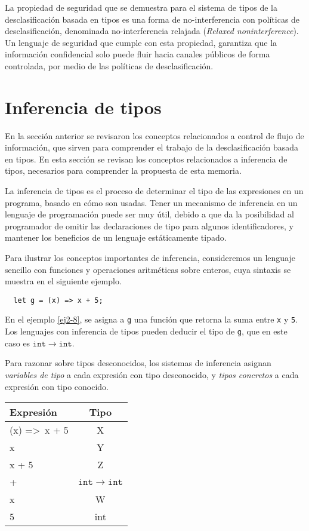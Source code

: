 La propiedad de seguridad que se demuestra para el sistema de tipos de la desclasificación basada en tipos es una forma de no-interferencia con políticas de desclasificación, denominada no-interferencia relajada (\emph{Relaxed noninterference}). Un lenguaje de seguridad que cumple con esta propiedad, garantiza que la información confidencial solo puede fluir hacia canales públicos de forma controlada, por medio de las políticas de desclasificación.

\section{Inferencia de tipos} \label{inference}
En la sección anterior se revisaron los conceptos relacionados a control de flujo de información, que sirven para comprender el trabajo de la desclasificación basada en tipos. En esta sección se revisan los conceptos relacionados a inferencia de tipos, necesarios para comprender la propuesta de esta memoria.

La inferencia de tipos es el proceso de determinar el tipo de las expresiones en un programa, basado en cómo son usadas. Tener un mecanismo de inferencia en un lenguaje de programación puede ser muy útil, debido a que da la posibilidad al programador de omitir las declaraciones de tipo para algunos identificadores, y mantener los beneficios de un lenguaje estáticamente tipado.

Para ilustrar los conceptos importantes de inferencia, consideremos un lenguaje sencillo con funciones y operaciones aritméticas sobre enteros, cuya sintaxis se muestra en el siguiente ejemplo.
\vspace{0.8em}
\begin{ej}
  \normalfont
  \label{ej2-8}
\begin{lstlisting}
  let g = (x) => x + 5;
\end{lstlisting}
\end{ej}

En el ejemplo \ref{ej2-8}, se asigna a \texttt{g} una función que retorna la suma entre \texttt{x} y \texttt{5}. Los lenguajes con inferencia de tipos pueden deducir el tipo de \texttt{g}, que en este caso es $\mathtt{int \rightarrow int}$.

Para razonar sobre tipos desconocidos, los sistemas de inferencia asignan \emph{variables de tipo} a cada expresión con tipo desconocido, y \emph{tipos concretos} a cada expresión con tipo conocido.

\begin{center}
  \ttfamily
  \begin{tabular}{l c}
    Expresión & Tipo \\
    \hline
    (x) =>\ x + 5 & X \\
    x & Y \\
    x + 5 & Z \\
    + & $\mathtt{int \rightarrow int}$ \\
    x & W \\
    5 & int \\
  \end{tabular}
\end{center}


